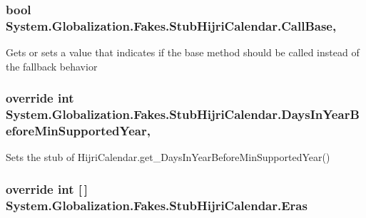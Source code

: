 \hypertarget{class_system_1_1_globalization_1_1_fakes_1_1_stub_hijri_calendar_a5ce5f38a7477cad58c23f521998badc2}{
\subsubsection[{Call\-Base}]{\setlength{\rightskip}{0pt plus 5cm}bool System.\-Globalization.\-Fakes.\-Stub\-Hijri\-Calendar.\-Call\-Base\hspace{0.3cm}{\ttfamily [get]}, {\ttfamily [set]}}}\label{class_system_1_1_globalization_1_1_fakes_1_1_stub_hijri_calendar_a5ce5f38a7477cad58c23f521998badc2}


Gets or sets a value that indicates if the base method should be called instead of the fallback behavior

\hypertarget{class_system_1_1_globalization_1_1_fakes_1_1_stub_hijri_calendar_ad116fbdbf439684cd6f122aec497dbbf}{
\subsubsection[{Days\-In\-Year\-Before\-Min\-Supported\-Year}]{\setlength{\rightskip}{0pt plus 5cm}override int System.\-Globalization.\-Fakes.\-Stub\-Hijri\-Calendar.\-Days\-In\-Year\-Before\-Min\-Supported\-Year\hspace{0.3cm}{\ttfamily [get]}, {\ttfamily [protected]}}}\label{class_system_1_1_globalization_1_1_fakes_1_1_stub_hijri_calendar_ad116fbdbf439684cd6f122aec497dbbf}


Sets the stub of Hijri\-Calendar.\-get\-\_\-\-Days\-In\-Year\-Before\-Min\-Supported\-Year()

\hypertarget{class_system_1_1_globalization_1_1_fakes_1_1_stub_hijri_calendar_ac9923c0566caa458bcf03a667b189697}{
\subsubsection[{Eras}]{\setlength{\rightskip}{0pt plus 5cm}override int \mbox{[}$\,$\mbox{]} System.\-Globalization.\-Fakes.\-Stub\-Hijri\-Calendar.\-Eras\hspace{0.3cm}{\ttfamily [get]}}}\label{class_system_1_1_globalization_1_1_fakes_1_1_stub_hijri_calendar_ac9923c0566caa458bcf03a667b189697}


